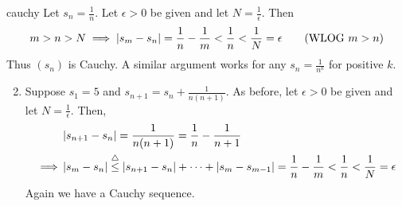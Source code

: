 \begin{examples}{}{cauchy}
	\exstart Let $s_n=\frac 1n$. Let $\epsilon>0$ be given and let $N=\frac 1\epsilon$. Then
	\[
		m>n>N\implies \left| s_m-s_n\right|=\frac 1n-\frac 1m<\frac 1n<\frac 1N=\epsilon \tag{WLOG $m>n$}
	\]
	Thus $(s_n)$ is Cauchy. A similar argument works for any $s_n=\frac 1{n^k}$ for positive $k$.
	  
	\begin{enumerate}\setcounter{enumi}{1}
	  \item\label{ex:cauchy3} Suppose $s_1=5$ and $s_{n+1}=s_n+\frac{1}{n(n+1)}$. As before, let $\epsilon>0$ be given and let $N=\frac 1\epsilon$. Then,
	  \begin{align*}
		  &\left| s_{n+1}-s_n\right|=\frac 1{n(n+1)}=\frac 1n-\frac 1{n+1}\\
		  \implies &\left| s_m-s_n\right|\overset{\triangle}{\le} \left| s_{n+1}-s_n\right|+\cdots+\left| s_m-s_{m-1}\right| = \frac 1n-\frac 1m<\frac 1n<\frac 1N=\epsilon
	  \end{align*}
	  Again we have a Cauchy sequence.
	  
	  \goodbreak
	  

\end{enumerate}
\end{examples}
